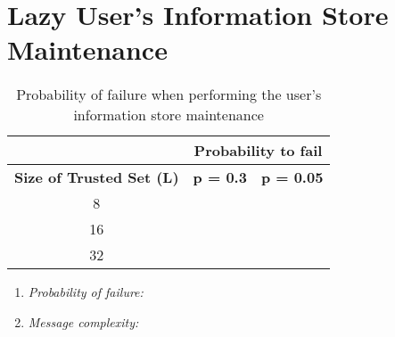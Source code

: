 \section{Lazy User's Information Store Maintenance}
\label{sec:eval_lazy_maintenance}
  \begin{table}
    \centering
    \footnotesize
    \begin{tabular}{|c|c|c|}
      \cline{2-3}
      \multicolumn{1}{c|}{}&  \multicolumn{2}{c|}{\textbf{Probability to fail}} \\ \cline{2-3}
      \hline
      \textbf{Size of Trusted Set (L)} & \textbf{p = 0.3} & \textbf{p = 0.05} \\
      \hline \hline
      8 &  &  \\
      \hline
      16 &  &  \\
      \hline
      32 &  &  \\
      \hline
    \end{tabular}
    \caption{Probability of failure when performing the user's information store maintenance}
    \label{tab:p_lazy_maintenance}
  \end{table}
  
  \begin{enumerate}
    \item{\textit{Probability of failure:}}
    \item{\textit{Message complexity:}}
  \end{enumerate}

